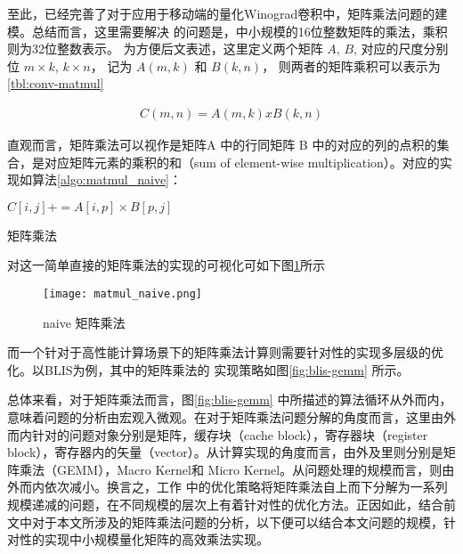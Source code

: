 至此，已经完善了对于应用于移动端的量化Winograd卷积中，矩阵乘法问题的建模。总结而言，这里需要解决
的问题是，中小规模的16位整数矩阵的乘法，乘积则为32位整数表示。 为方便后文表述，这里定义两个矩阵 $A$, $B$, 对应的尺度分别位 $m \times k$, $k \times n$， 记为 $A(m, k) $ 和 $ B(k, n) $， 则两者的矩阵乘积可以表示为\ref{tbl:conv-matmul}

\begin{align}
  C(m, n) = A(m, k) x B(k, n)
\end{align}

直观而言，矩阵乘法可以视作是矩阵A 中的行同矩阵 B 中的对应的列的点积的集合，是对应矩阵元素的乘积的和（sum of element-wise multiplication）。对应的实现如算法\ref{algo:matmul_naive}：

\begin{algorithm}
  \begin{algorithmic}
        \State $C[i, j] += A[i, p] \times B[p, j] $
        \EndFor
      \EndFor
    \EndFor
  \end{algorithmic}
  \caption{矩阵乘法}
  \label{algo:matmul_naive}
\end{algorithm}


对这一简单直接的矩阵乘法的实现的可视化可如下图\ref{fig:naive_matmul}所示

\begin{figure}
\centering
\texttt{[image: matmul\_naive.png]}
\caption{naive 矩阵乘法}
\label{fig:naive_matmul}
\end{figure}

而一个针对于高性能计算场景下的矩阵乘法计算则需要针对性的实现多层级的优化。以BLIS\cite{BLIS1}为例，其中的矩阵乘法的
实现策略如图\ref{fig:blis-gemm} 所示。

总体来看，对于矩阵乘法而言，图\ref{fig:blis-gemm} 中所描述的算法循环从外而内，意味着问题的分析由宏观入微观。在对于矩阵乘法问题分解的角度而言，这里由外而内针对的问题对象分别是矩阵，缓存块（cache block），寄存器块（register block），寄存器内的矢量（vector）。从计算实现的角度而言，由外及里则分别是矩阵乘法（GEMM），Macro Kernel和 Micro Kernel。从问题处理的规模而言，则由外而内依次减小。换言之，工作\cite{BLIS1} 中的优化策略将矩阵乘法自上而下分解为一系列规模递减的问题，在不同规模的层次上有着针对性的优化方法。正因如此，结合前文中对于本文所涉及的矩阵乘法问题的分析，以下便可以结合本文问题的规模，针对性的实现中小规模量化矩阵的高效乘法实现。


